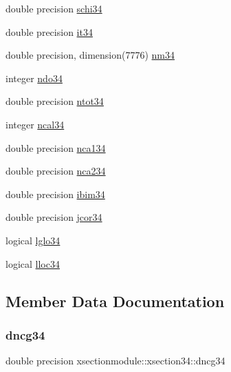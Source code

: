 \begin{DoxyCompactItemize}
\item 
double precision \hyperlink{structxsectionmodule_1_1xsection34_ae56774879e08775afacef3e0fea47c6c}{schi34}
\item 
double precision \hyperlink{structxsectionmodule_1_1xsection34_a55da1bcd8971b7378e215febc94776c9}{it34}
\item 
double precision, dimension(7776) \hyperlink{structxsectionmodule_1_1xsection34_abb8dcf74df34d331716559e660ff6e08}{nm34}
\item 
integer \hyperlink{structxsectionmodule_1_1xsection34_acfad5775fea8e4290eadfd569c55b21f}{ndo34}
\item 
double precision \hyperlink{structxsectionmodule_1_1xsection34_a15c6d32ec59fc85898539ea9519b486d}{ntot34}
\item 
integer \hyperlink{structxsectionmodule_1_1xsection34_aa5325cbbb9c41fe1d398fad9a1c46da8}{ncal34}
\item 
double precision \hyperlink{structxsectionmodule_1_1xsection34_a9473719a7b59aacf5bc245abbaa993a1}{nca134}
\item 
double precision \hyperlink{structxsectionmodule_1_1xsection34_a6f4f3f5a9c8a6f4a47a7e65aab8b68b4}{nca234}
\item 
double precision \hyperlink{structxsectionmodule_1_1xsection34_aa06ab86e60880feaae8feabd8ec207c8}{ibim34}
\item 
double precision \hyperlink{structxsectionmodule_1_1xsection34_a43f41414a5d4ec9931a8c80f08507487}{jcor34}
\item 
logical \hyperlink{structxsectionmodule_1_1xsection34_a7fc223eb8ac9fa6bd0465ee0390388ef}{lglo34}
\item 
logical \hyperlink{structxsectionmodule_1_1xsection34_aaf8f419d827df4cec676398cb9828bf3}{lloc34}
\end{DoxyCompactItemize}


\subsection{Member Data Documentation}
\mbox{\label{structxsectionmodule_1_1xsection34_a080249ff8b9a05657573a8ef261648f7}} 
\subsubsection{\texorpdfstring{dncg34}{dncg34}}
{\footnotesize\ttfamily double precision xsectionmodule\+::xsection34\+::dncg34}

